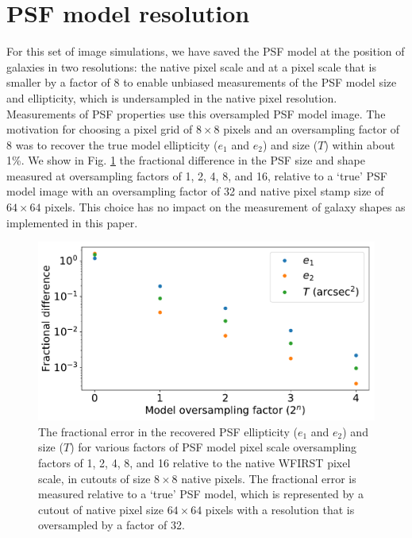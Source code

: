 \documentclass[usenatbib]{mnras}
\begin{document}
\section{PSF model resolution}
\label{app:psf_resol}

For this set of image simulations, we have saved the PSF model at the position of galaxies in two resolutions: the native pixel scale and at a pixel scale that is smaller by a factor of 8 to enable unbiased measurements of the PSF model size and ellipticity, which is undersampled in the native pixel resolution. Measurements of PSF properties use this oversampled PSF model image. The motivation for choosing a pixel grid of $8\times8$ pixels and an oversampling factor of 8 was to recover the true model ellipticity ($e_1$ and $e_2$) and size ($T$) within about 1\%. We show in Fig. \ref{fig:psf_oversampling} the fractional difference in the PSF size and shape measured at oversampling factors of 1, 2, 4, 8, and 16, relative to a `true' PSF model image with an oversampling factor of 32 and native pixel stamp size of $64\times 64$ pixels. This choice has no impact on the measurement of galaxy shapes as implemented in this paper.
 
\begin{figure}
\begin{center}
\includegraphics[width=\columnwidth]{figures/psf_oversampling.pdf}
\end{center}
\caption[]{
The fractional error in the recovered PSF ellipticity ($e_1$ and $e_2$) and size ($T$) for various factors of PSF model pixel scale oversampling factors of 1, 2, 4, 8, and 16 relative to the native WFIRST pixel scale, in cutouts of size $8\times 8$ native pixels. The fractional error is measured relative to a `true' PSF model, which is represented by a cutout of native pixel size $64\times64$ pixels with a resolution that is oversampled by a factor of 32.
\label{fig:psf_oversampling}}
\end{figure}


\bsp	
\label{lastpage}
\end{document}
